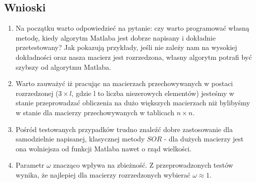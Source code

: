 \documentclass{article}
\begin{document}
\subsection{Wnioski}
\begin{enumerate}
\item Na początku warto odpowiedzieć na pytanie: czy warto programować własną metodę, kiedy algorytm Matlaba jest dobrze napisany i dokładnie przetestowany? Jak pokazują przykłady, jeśli nie zależy nam na wysokiej dokładności oraz nasza macierz jest rozrzedzona, własny algorytm potrafi być szybszy od algorytmu Matlaba.
\item Warto zauważyć iż pracując na macierzach przechowywanych w postaci rozrzedzonej ($3\times l$, gdzie l to liczba niezerowych elementów) jesteśmy w stanie przeprowadzać obliczenia na dużo większych macierzach niż bylibyśmy w stanie dla macierzy przechowywanych w tablicach $n \times n$.
\item Pośród testowanych przypadków trudno znaleźć dobre zastosowanie dla samodzielnie napisanej, klasycznej metody $SOR$ - dla dużych macierzy jest ona wolniejsza od funkcji Matlaba nawet o rząd wielkości.
\item Parametr $\omega$ znacząco wpływa na zbieżność. Z przeprowadzonych testów wynika, że najlepiej dla macierzy rozrzedzonych wybierać $\omega \approx 1$.
\end{enumerate}
\end{document}
